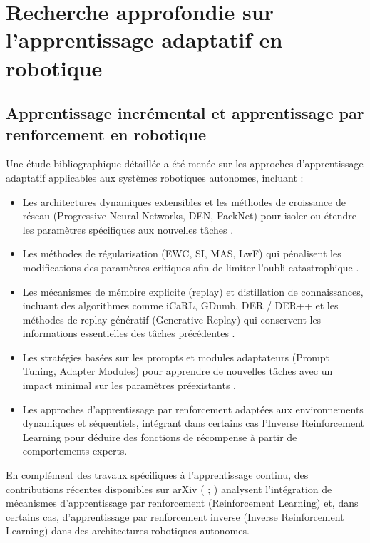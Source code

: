 \section{Recherche approfondie sur l’apprentissage adaptatif en robotique}

\subsection{Apprentissage incrémental et apprentissage par renforcement en robotique}

Une étude bibliographique détaillée a été menée sur les approches d’apprentissage adaptatif applicables aux systèmes robotiques autonomes, incluant :
\begin{itemize}
    \item Les architectures dynamiques extensibles et les méthodes de croissance de réseau (Progressive Neural Networks, DEN, PackNet) pour isoler ou étendre les paramètres spécifiques aux nouvelles tâches \cite{pnn_2016, den_2018, packnet_cvpr}.
    
    \item Les méthodes de régularisation (EWC, SI, MAS, LwF) qui pénalisent les modifications des paramètres critiques afin de limiter l’oubli catastrophique \cite{ewc_2017, arxiv_1703_04200, arxiv_1711_09601, arxiv_1606_09282}.
    
    \item Les mécanismes de mémoire explicite (replay) et distillation de connaissances, incluant des algorithmes comme iCaRL, GDumb, DER / DER++ et les méthodes de replay génératif (Generative Replay) qui conservent les informations essentielles des tâches précédentes \cite{icarl_2016, gdumb_eccv, der_neurips}.
    
    \item Les stratégies basées sur les prompts et modules adaptateurs (Prompt Tuning, Adapter Modules) pour apprendre de nouvelles tâches avec un impact minimal sur les paramètres préexistants \cite{prompt_tuning_2025}.
    
    \item Les approches d’apprentissage par renforcement adaptées aux environnements dynamiques et séquentiels, intégrant dans certains cas l’Inverse Reinforcement Learning pour déduire des fonctions de récompense à partir de comportements experts.
\end{itemize}

En complément des travaux spécifiques à l’apprentissage continu, des contributions récentes disponibles sur arXiv (\cite{safe_learning_robotics} ; \cite{bio_inspired_robotics}) analysent l’intégration de mécanismes d’apprentissage par renforcement (Reinforcement Learning) et, dans certains cas, d’apprentissage par renforcement inverse (Inverse Reinforcement Learning) dans des architectures robotiques autonomes.

